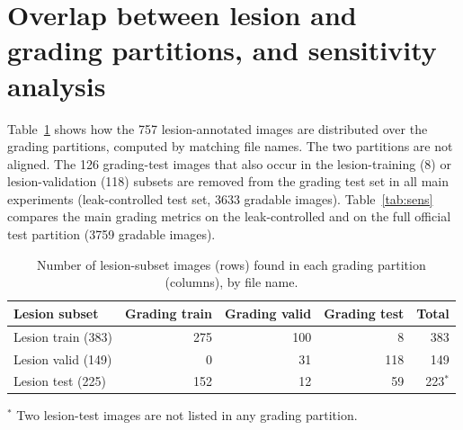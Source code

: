 \section{Overlap between lesion and grading partitions, and sensitivity analysis}
\label{app:leak}
Table~\ref{tab:overlap} shows how the 757 lesion-annotated images are distributed over the grading partitions, computed by matching file names. The two partitions are not aligned. The 126 grading-test images that also occur in the lesion-training (8) or lesion-validation (118) subsets are removed from the grading test set in all main experiments (leak-controlled test set, 3633 gradable images). Table~\ref{tab:sens} compares the main grading metrics on the leak-controlled and on the full official test partition (3759 gradable images).

\begin{table}[h]
\centering
\caption{Number of lesion-subset images (rows) found in each grading partition (columns), by file name.}
\label{tab:overlap}
\small
\begin{tabular}{@{}lrrrr@{}}
\toprule
Lesion subset & Grading train & Grading valid & Grading test & Total \\
\midrule
Lesion train (383) & 275 & 100 & 8 & 383 \\
Lesion valid (149) & 0 & 31 & 118 & 149 \\
Lesion test (225) & 152 & 12 & 59 & 223$^{*}$ \\
\bottomrule
\end{tabular}

\vspace{2pt}
{\footnotesize $^{*}$ Two lesion-test images are not listed in any grading partition.}
\end{table}



